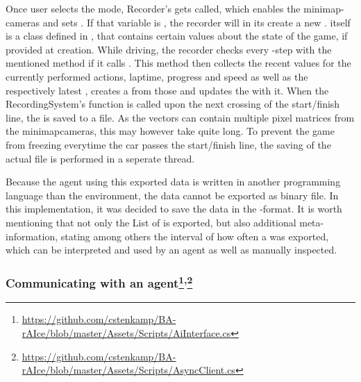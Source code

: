 Once user selects the  mode, Recorder's  gets called, which enables the minimap-cameras and sets . If that variable is , the recorder will in its  create a new .  itself is a class defined in , that contains certain values about the state of the game, if provided at creation. While driving, the recorder checks every -step with the mentioned method if it calls . This method then collects the recent values for the currently performed actions, laptime, progress and speed as well as the respectively latest , creates a  from those and updates the  with it. When the RecordingSystem's  function is called upon the next crossing of the start/finish line, the  is saved to a file. As the vectors can contain multiple pixel matrices from the minimapcameras, this may however take quite long. To prevent the game from freezing everytime the car passes the start/finish line, the saving of the actual file is performed in a seperate thread.

Because the agent using this exported data is written in another programming language than the environment, the data cannot be exported as binary file. In this implementation, it was decided to save the data in the -format. It is worth mentioning that not only the List of  is exported, but also additional meta-information, stating among others the interval of how often a  was exported, which can be interpreted and used by an agent as well as manually inspected.

\subsubsection{Communicating with an agent\footnote{\url{https://github.com/cstenkamp/BA-rAIce/blob/master/Assets/Scripts/AiInterface.cs}}\textsuperscript{,}\footnote{\url{https://github.com/cstenkamp/BA-rAIce/blob/master/Assets/Scripts/AsyncClient.cs}}}


